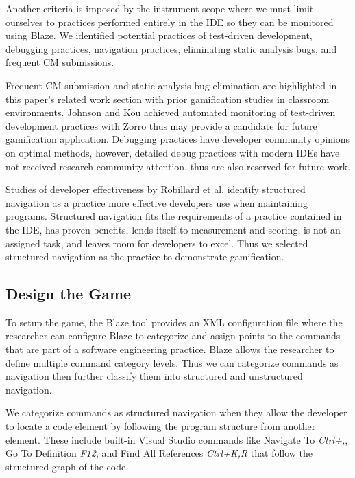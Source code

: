 \documentclass{sig-alternate}
\begin{document}
Another criteria is imposed by the instrument scope where we must limit ourselves to practices performed entirely in the IDE so they can be monitored using Blaze.  We identified potential practices of test-driven development, debugging practices, navigation practices,  eliminating static analysis bugs, and frequent CM submissions.  

Frequent CM submission and static analysis bug elimination are highlighted in this paper's related work section with prior gamification studies in classroom environments.  Johnson and Kou achieved automated monitoring of test-driven development practices with Zorro \cite{V:Johnson2007Automated} thus may provide a candidate for future gamification application.   
Debugging practices have developer community opinions on optimal methods, however, detailed debug practices with modern IDEs have not received research community attention, thus are also reserved for future work.  

Studies of developer effectiveness by Robillard et al.\cite{wbsnipes:Robillard2004How} identify structured navigation as a practice more effective developers use when maintaining programs.   Structured navigation fits the requirements of a practice contained in the IDE, has proven benefits, lends itself to measurement and scoring, is not an assigned task, and leaves room for developers to excel.  Thus we selected structured navigation as the practice to demonstrate gamification.

\subsection{Design the Game}

To setup the game, the Blaze tool provides an XML configuration file where the researcher can configure Blaze to categorize and assign points to the commands that are part of a software engineering practice.  Blaze allows the researcher to define multiple command category levels.  Thus we can categorize commands as navigation then further classify them into structured and unstructured navigation.  

We categorize commands as structured navigation when they allow the developer to locate a code element by following the program structure from another element.  These include  built-in Visual Studio commands like Navigate To \textit{Ctrl+,}, Go To Definition \textit{F12}, and Find All References \textit{Ctrl+K,R}  that follow the structured graph of the code.
\end{document}
